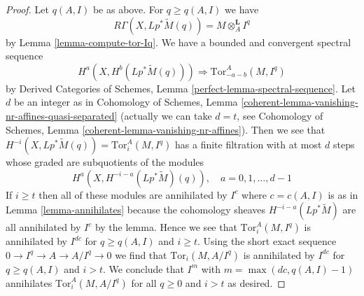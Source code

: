 \documentclass[10pt,a4paper]{amsart}
\theoremstyle{plain}
\theoremstyle{definition}
\theoremstyle{remark}
\numberwithin{equation}{subsection}
\begin{document}
\begin{proof}
Let $q(A, I)$ be as above. For $q \geq q(A, I)$ we have
$$
R\Gamma(X, Lp^*\widetilde{M}(q)) = M \otimes_A^\mathbf{L} I^q
$$
by Lemma \ref{lemma-compute-tor-Iq}.
We have a bounded and convergent spectral sequence
$$
H^a(X, H^b(Lp^*\widetilde{M}(q))) \Rightarrow
\text{Tor}_{-a - b}^A(M, I^q)
$$
by Derived Categories of Schemes, Lemma \ref{perfect-lemma-spectral-sequence}.
Let $d$ be an integer as in Cohomology of Schemes, Lemma
\ref{coherent-lemma-vanishing-nr-affines-quasi-separated}
(actually we can take $d = t$, see
Cohomology of Schemes, Lemma \ref{coherent-lemma-vanishing-nr-affines}).
Then we see that $H^{-i}(X, Lp^*\widetilde{M}(q)) = \text{Tor}_i^A(M, I^q)$
has a finite filtration with at most $d$ steps whose graded are
subquotients of the modules
$$
H^a(X, H^{- i - a}(Lp^*\widetilde{M})(q)),\quad
a = 0, 1, \ldots, d - 1
$$
If $i \geq t$ then all of these modules are annihilated
by $I^c$ where $c = c(A, I)$ is as in Lemma \ref{lemma-annihilates}
because the cohomology sheaves $H^{- i - a}(Lp^*\widetilde{M})$
are all annihilated by $I^c$ by the lemma. Hence we see that
$\text{Tor}_i^A(M, I^q)$ is annihilated by $I^{dc}$ for
$q \geq q(A, I)$ and $i \geq t$. Using the short exact sequence
$0 \to I^q \to A \to A/I^q \to 0$ we find that
$\text{Tor}_i(M, A/I^q)$ is annihilated by $I^{dc}$ for $q \geq q(A, I)$
and $i > t$. We conclude that $I^m$ with $m = \max(dc, q(A, I) - 1)$
annihilates $\text{Tor}_i^A(M, A/I^q)$ for all $q \geq 0$
and $i > t$ as desired.
\end{proof}
\end{document}
